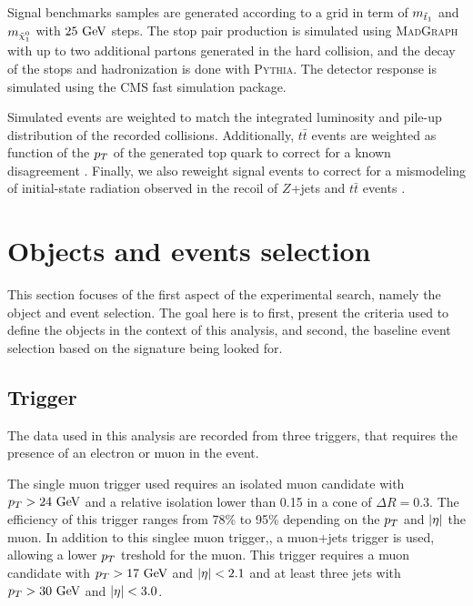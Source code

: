     Signal benchmarks samples are generated according to a grid in term of $m_{\tilde{t}_1}$
    and $m_{\tilde{\chi}_1^0}$ with $25~\text{GeV}$ steps. The stop pair production is simulated
    using \textsc{MadGraph} with up to two additional partons generated in the hard collision,
    and the decay of the stops and hadronization is done with \textsc{Pythia}. The detector
    response is simulated using the CMS fast simulation package.

    Simulated events are weighted to match the integrated luminosity and pile-up distribution
    of the recorded collisions. Additionally, $t\bar{t}$ events are weighted as function of
    the $p_T$ of the generated top quark to correct for a known disagreement .
    Finally, we also reweight signal events to correct for a mismodeling of initial-state
    radiation observed in the recoil of $Z$+jets and $t\bar{t}$ events \cite{ISRmodelingDominick}.

    \section{Objects and events selection \label{sec:analysis_objectAndEventSelection}}

    This section focuses of the first aspect of the experimental search, namely the object
    and event selection. The goal here is to first, present the criteria used to define the
    objects in the context of this analysis, and second, the baseline event selection based
    on the signature being looked for.

        \subsection{Trigger}

    The data used in this analysis are recorded from three triggers, that requires the
    presence of an electron or muon in the event.

    The single muon trigger used requires an isolated muon candidate with $p_T > 24~\text{GeV}$
    and a relative isolation lower than 0.15 in a cone of $\Delta R = 0.3$. The efficiency
    of this trigger ranges from 78\% to 95\% depending on the $p_T$ and $\left| \eta \right|$ the muon.
    In addition to this singlee muon trigger,, a muon+jets trigger is used, allowing a
    lower $p_T$ treshold for the muon. This trigger requires a muon candidate with
    $p_T > 17~\text{GeV}$ and $\left| \eta \right| < 2.1$ and at least three jets with $p_T > 30~\text{GeV}$ and
    $\left| \eta \right| < 3.0$. 

